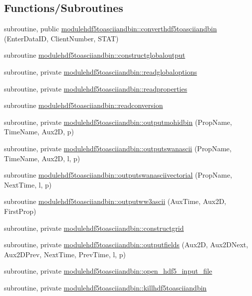 \subsection*{Functions/\+Subroutines}
\begin{DoxyCompactItemize}
\item 
subroutine, public \mbox{\hyperlink{namespacemodulehdf5toasciiandbin_a043d466c48df398adb80b3cb771a0b47}{modulehdf5toasciiandbin\+::converthdf5toasciiandbin}} (Enter\+Data\+ID, Client\+Number, S\+T\+AT)
\item 
subroutine \mbox{\hyperlink{namespacemodulehdf5toasciiandbin_ae2d0b8b9ab26e879bc85d79fd4815b5d}{modulehdf5toasciiandbin\+::constructglobaloutput}}
\item 
subroutine, private \mbox{\hyperlink{namespacemodulehdf5toasciiandbin_acdf03424042f9020f63ddb9bd5d39fce}{modulehdf5toasciiandbin\+::readglobaloptions}}
\item 
subroutine, private \mbox{\hyperlink{namespacemodulehdf5toasciiandbin_afad7dca87cff93eae4b5e8a18fdbbec3}{modulehdf5toasciiandbin\+::readproperties}}
\item 
subroutine \mbox{\hyperlink{namespacemodulehdf5toasciiandbin_aac7befc5bf0dee74c56166ddb4432fca}{modulehdf5toasciiandbin\+::readconversion}}
\item 
subroutine, private \mbox{\hyperlink{namespacemodulehdf5toasciiandbin_aff18abddac541bb4eb02be3abb3aa389}{modulehdf5toasciiandbin\+::outputmohidbin}} (Prop\+Name, Time\+Name, Aux2D, p)
\item 
subroutine, private \mbox{\hyperlink{namespacemodulehdf5toasciiandbin_ad9bbff03f3e4066dec1d8a161e2d0be4}{modulehdf5toasciiandbin\+::outputswanascii}} (Prop\+Name, Time\+Name, Aux2D, l, p)
\item 
subroutine \mbox{\hyperlink{namespacemodulehdf5toasciiandbin_a1065af2accb4bf167b115af350e3c406}{modulehdf5toasciiandbin\+::outputswanasciivectorial}} (Prop\+Name, Next\+Time, l, p)
\item 
subroutine \mbox{\hyperlink{namespacemodulehdf5toasciiandbin_a360088fc269895ed548f164fb5b46a13}{modulehdf5toasciiandbin\+::outputww3ascii}} (Aux\+Time, Aux2D, First\+Prop)
\item 
subroutine, private \mbox{\hyperlink{namespacemodulehdf5toasciiandbin_aa5588d4c881fba9ebc04c57393f30c76}{modulehdf5toasciiandbin\+::constructgrid}}
\item 
subroutine, private \mbox{\hyperlink{namespacemodulehdf5toasciiandbin_a086893f6436263f0d9e808b779d5441d}{modulehdf5toasciiandbin\+::outputfields}} (Aux2D, Aux2\+D\+Next, Aux2\+D\+Prev, Next\+Time, Prev\+Time, l, p)
\item 
subroutine, private \mbox{\hyperlink{namespacemodulehdf5toasciiandbin_ac11d594ac1ad5acf256f4066315f5028}{modulehdf5toasciiandbin\+::open\+\_\+hdf5\+\_\+input\+\_\+file}}
\item 
subroutine, private \mbox{\hyperlink{namespacemodulehdf5toasciiandbin_ae236e6042f891aa8f0a07236763a82d6}{modulehdf5toasciiandbin\+::killhdf5toasciiandbin}}
\end{DoxyCompactItemize}
